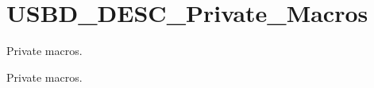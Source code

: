 \hypertarget{group__USBD__DESC__Private__Macros}{}\section{U\+S\+B\+D\+\_\+\+D\+E\+S\+C\+\_\+\+Private\+\_\+\+Macros}
\label{group__USBD__DESC__Private__Macros}


Private macros.  


Private macros. 

